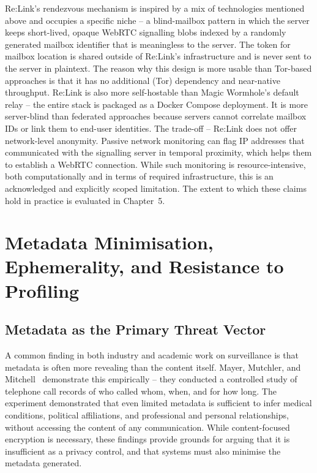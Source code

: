 \documentclass[12pt,a4paper,oneside]{report}
\begin{document}
Re:Link's rendezvous mechanism is inspired by a mix of technologies mentioned above and occupies a specific niche -- a blind-mailbox pattern in which the server keeps short-lived, opaque WebRTC signalling blobs indexed by a randomly generated mailbox identifier that is meaningless to the server. The token for mailbox location is shared outside of Re:Link's infrastructure and is never sent to the server in plaintext. The reason why this design is more usable than Tor-based approaches is that it has no additional (Tor) dependency and near-native throughput. Re:Link is also more self-hostable than Magic Wormhole's default relay -- the entire stack is packaged as a Docker Compose deployment. It is more server-blind than federated approaches because servers cannot correlate mailbox IDs or link them to end-user identities. The trade-off -- Re:Link does not offer network-level anonymity. Passive network monitoring can flag IP addresses that communicated with the signalling server in temporal proximity, which helps them to establish a WebRTC connection. While such monitoring is resource-intensive, both computationally and in terms of required infrastructure, this is an acknowledged and explicitly scoped limitation. The extent to which these claims hold in practice is evaluated in Chapter~5.


\section{Metadata Minimisation, Ephemerality, and Resistance to Profiling}
\label{sec:metadata-minimisation}

\subsection{Metadata as the Primary Threat Vector}
\label{sec:metadata-threat}

A common finding in both industry and academic work on surveillance is that metadata is often more revealing than the content itself. Mayer, Mutchler, and Mitchell~\cite{mayer2016} demonstrate this empirically -- they conducted a controlled study of telephone call records of who called whom, when, and for how long. The experiment demonstrated that even limited metadata is sufficient to infer medical conditions, political affiliations, and professional and personal relationships, without accessing the content of any communication. While content-focused encryption is necessary, these findings provide grounds for arguing that it is insufficient as a privacy control, and that systems must also minimise the metadata generated.
\end{document}
